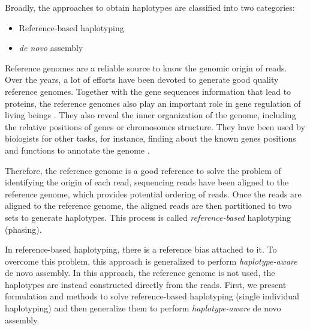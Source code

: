 Broadly, the approaches to obtain haplotypes are classified into two categories:
\begin{itemize}
 \item Reference-based haplotyping
 \item \textit{de novo} assembly
\end{itemize}

Reference genomes are a reliable source to know the genomic origin of reads. 
Over the years, a lot of efforts have been devoted to generate good quality reference genomes.
Together with the gene sequences information that lead to proteins, the reference genomes also play an important role in gene regulation of living beings \citep{encode2004encode}. 
They also reveal the inner organization of the genome,
including the relative positions of genes or chromosomes structure. 
They have been used by biologists for other tasks, for instance, finding about the known genes
positions and functions to annotate the genome \citep{harrow2012gencode}.

Therefore, the reference genome is a good reference to solve the problem of identifying the origin of each read, sequencing reads have been aligned to the reference genome, which provides potential ordering of reads.
Once the reads are aligned to the reference genome, the aligned reads are then partitioned to two sets to generate haplotypes. This process is called \textit{reference-based} haplotyping (phasing).

In reference-based haplotyping, there is a reference bias attached to it. To overcome this problem, this approach is generalized to perform \textit{haplotype-aware} de novo assembly.
In this approach, the reference genome is not used, the haplotypes are instead constructed directly from the reads.
First, we present formulation and methods to solve reference-based haplotyping (single individual haplotyping) and then generalize them to perform \textit{haplotype-aware} de novo assembly.
